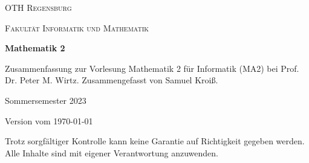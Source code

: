 \begin{titlepage}
    \centering
    {\textsc{OTH Regensburg} \par}
    {\textsc{Fakultät Informatik und Mathematik} \par}
    \vspace{4cm}
    {\Huge\bfseries 
        Mathematik 2
    \par}
    \vspace{2cm}
    {\Large
        Zusammenfassung zur Vorlesung Mathematik 2 für Informatik (MA2) bei Prof. Dr. Peter M. Wirtz.
        Zusammengefasst von Samuel Kroiß.
    \par}
    \vfill
    {\large Sommersemester 2023 \par Version vom \today\par}
    \vfill
    Trotz sorgfältiger Kontrolle kann keine Garantie auf Richtigkeit gegeben werden. Alle Inhalte sind mit eigener Verantwortung anzuwenden.
\end{titlepage}